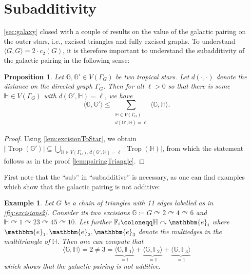 \documentclass[11pt,reqno,a4paper]{amsart}
\theoremstyle{theoremstyle}
\newtheorem{proposition}[theorem]{Proposition}
\theoremstyle{examplestyle}
\newtheorem{example}[theorem]{Example}
\theoremstyle{algorithmstyle}
\newcommand{\ee}{\mathbbm{e}}
\newcommand{\FF}{\mathbb{F}}
\newcommand{\GG}{\mathbb{G}}
\newcommand{\HH}{\mathbb{H}}
\DeclareMathOperator{\Trop}{Trop}
\begin{document}


\section{Subadditivity}\label{sec:subadditivity}
\cref{sec:galaxy} closed with a couple of results on the value of the galactic pairing on the outer stars, i.e., excised triangles and fully excised graphs.  To understand $\langle G, G\rangle=2\cdot c_2(G)$, it is therefore important to understand the subadditivity of the galactic pairing in the following sense:

\begin{proposition}
  \label{prop:subadditivity}
  Let $\GG,\GG'\in V(\Gamma_G)$ be two tropical stars.  Let $d(\cdot,\cdot)$ denote the distance on the directed graph $\Gamma_G$.  Then for all $\ell>0$ so that there is some $\HH\in V(\Gamma_G)$ with $d(\GG',\HH)=\ell$, we have
  \begin{equation*}
    \langle \GG, \GG'\rangle \leq \sum_{\substack{\HH\in V(\Gamma_G)\\ d(\GG',\HH)=\ell}} \langle \GG,\HH\rangle.
  \end{equation*}
\end{proposition}
\begin{proof}
  Using \cref{lem:excisionToStar}, we obtain $|\Trop(\GG')|\subseteq \bigcup_{\HH\in V(\Gamma_G), d(\GG',\HH)=\ell} |\Trop(\HH)|$, from which the statement follows as in the proof \cref{lem:pairingTriangle}.
\end{proof}

First note that the ``sub'' in ``subadditive'' is necessary, as one can find examples which show that the galactic pairing is not additive:

\begin{example}
  \label{ex:nonAdditivity}
  Let $G$ be a chain of triangles with 11 edges labelled as in \cref{fig:excisions2}.  Consider its two excisions $\GG\coloneqq G\curvearrowright 2\curvearrowright 4\curvearrowright 6$ and $\HH \curvearrowright 1\curvearrowright 23\curvearrowright 45\curvearrowright 10$.
  Let further $\FF_i\coloneqq \HH \curvearrowright \ee_i$ where $\ee_1,\ee_2,\ee_3$ denote the multiedges in the multitriangle of $\HH$. Then one can compute that
  \begin{equation*}
    \langle \GG, \HH \rangle = 2\neq 3=\underbrace{\langle \GG,\FF_1\rangle}_{=1} + \underbrace{\langle \GG,\FF_2\rangle}_{=1} + \underbrace{\langle \GG,\FF_3\rangle}_{=1}
  \end{equation*}
  which shows that the galactic pairing is not additive.
\end{example}
\end{document}
